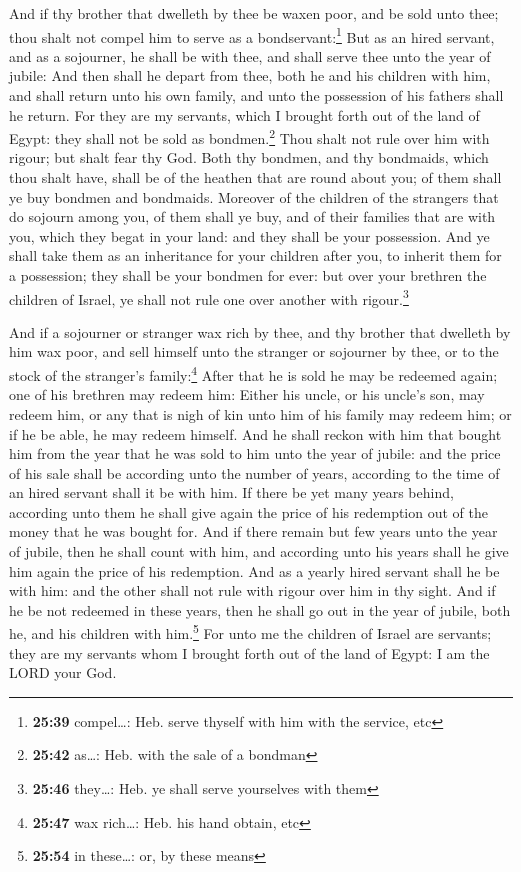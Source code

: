  And if thy brother that dwelleth by thee be waxen poor,
and be sold unto thee; thou shalt not compel him to serve as a
bondservant:\footnote{\textbf{25:39} compel\ldots: Heb. serve thyself
  with him with the service, etc}  But as an hired
servant, and as a sojourner, he shall be with thee, and shall serve thee
unto the year of jubile:  And then shall he depart from
thee, both he and his children with him, and shall return unto his own
family, and unto the possession of his fathers shall he return.
 For they are my servants, which I brought forth out of
the land of Egypt: they shall not be sold as bondmen.\footnote{\textbf{25:42}
  as\ldots: Heb. with the sale of a bondman}  Thou shalt
not rule over him with rigour; but shalt fear thy God. 
Both thy bondmen, and thy bondmaids, which thou shalt have, shall be of
the heathen that are round about you; of them shall ye buy bondmen and
bondmaids.  Moreover of the children of the strangers
that do sojourn among you, of them shall ye buy, and of their families
that are with you, which they begat in your land: and they shall be your
possession.  And ye shall take them as an inheritance for
your children after you, to inherit them for a possession; they shall be
your bondmen for ever: but over your brethren the children of Israel, ye
shall not rule one over another with rigour.\footnote{\textbf{25:46}
  they\ldots: Heb. ye shall serve yourselves with them}

 And if a sojourner or stranger wax rich by thee, and thy
brother that dwelleth by him wax poor, and sell himself unto the
stranger or sojourner by thee, or to the stock of the stranger's
family:\footnote{\textbf{25:47} wax rich\ldots: Heb. his hand obtain,
  etc}  After that he is sold he may be redeemed again;
one of his brethren may redeem him:  Either his uncle, or
his uncle's son, may redeem him, or any that is nigh of kin unto him of
his family may redeem him; or if he be able, he may redeem himself.
 And he shall reckon with him that bought him from the
year that he was sold to him unto the year of jubile: and the price of
his sale shall be according unto the number of years, according to the
time of an hired servant shall it be with him.  If there
be yet many years behind, according unto them he shall give again the
price of his redemption out of the money that he was bought for.
 And if there remain but few years unto the year of
jubile, then he shall count with him, and according unto his years shall
he give him again the price of his redemption.  And as a
yearly hired servant shall he be with him: and the other shall not rule
with rigour over him in thy sight.  And if he be not
redeemed in these years, then he shall go out in the year of jubile,
both he, and his children with him.\footnote{\textbf{25:54} in
  these\ldots: or, by these means}  For unto me the
children of Israel are servants; they are my servants whom I brought
forth out of the land of Egypt: I am the LORD your God.

